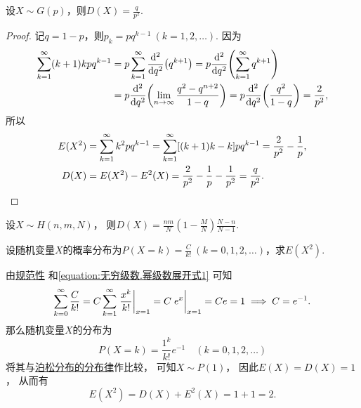 \begin{theorem}\label{theorem:随机变量的数字特征.几何分布的方差}
设\(X \sim G(p)\)，则\(D(X) = \frac{q}{p^2}\).
\begin{proof}
记\(q = 1-p\)，则\(p_k = pq^{k-1}\ (k=1,2,\dotsc)\).
因为\begin{align*}
	\sum_{k=1}^\infty (k+1)kpq^{k-1}
	&= p \sum_{k=1}^\infty \dv[2]{q}(q^{k+1})
	= p \dv[2]{q}(\sum_{k=1}^\infty q^{k+1}) \\
	&= p \dv[2]{q}(\lim_{n\to\infty} \frac{q^2-q^{n+2}}{1-q})
	= p \dv[2]{q}(\frac{q^2}{1-q})
	= \frac{2}{p^2}, \\
\end{align*}
所以\begin{align*}
	E(X^2) &= \sum_{k=1}^\infty k^2 pq^{k-1}
	= \sum_{k=1}^\infty [(k+1)k-k] pq^{k-1}
	= \frac{2}{p^2} - \frac{1}{p}, \\
	D(X) &= E(X^2) - E^2(X)
	= \frac{2}{p^2} - \frac{1}{p} - \frac{1}{p^2}
	= \frac{q}{p^2}.
	\qedhere
\end{align*}
\end{proof}
\end{theorem}

\begin{proposition}\label{theorem:随机变量的数字特征.超几何分布的方差}
设\(X \sim H(n,m,N)\)，
则\(D(X) = \frac{n m}{N} \left( 1 - \frac{M}{N} \right) \frac{N - n}{N - 1}\).
\end{proposition}

\begin{example}
设随机变量\(X\)的概率分布为\(P(X=k) = \frac{C}{k!}\ (k=0,1,2,\dotsc)\)，求\(E(X^2)\).
\begin{solution}
由\hyperref[theorem:随机变量及其分布.离散型随机变量的密度函数的性质]{规范性}%
和\cref{equation:无穷级数.幂级数展开式1} 可知\begin{equation*}
	\sum_{k=0}^\infty \frac{C}{k!}
	= C \sum_{k=1}^\infty \eval{\frac{x^k}{k!}}_{x=1}
	= C \eval{e^x}_{x=1}
	= C e = 1
	\implies
	C = e^{-1}.
\end{equation*}
那么随机变量\(X\)的分布为\begin{equation*}
	P(X=k) = \frac{1^k}{k!} e^{-1} \quad(k=0,1,2,\dotsc)
\end{equation*}
将其与\hyperref[equation:离散型分布.泊松分布的分布律]{泊松分布的分布律}作比较，
可知\(X \sim P(1)\)，
因此\(E(X) = D(X) = 1\)，
从而有\begin{equation*}
	E(X^2) = D(X) + E^2(X) = 1 + 1 = 2.
\end{equation*}
\end{solution}
\end{example}

